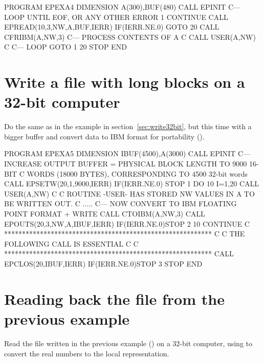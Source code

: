 \begin{XMP}
      PROGRAM EPEXA4
      DIMENSION A(300),BUF(480)
      CALL EPINIT
 C--- LOOP UNTIL EOF, OR ANY OTHER ERROR
     1 CONTINUE
      CALL EPREAD(10,3,NW,A,BUF,IERR)
      IF(IERR.NE.0)  GOTO 20
      CALL CFRIBM(A,NW,3)
 C--- PROCESS CONTENTS OF A
 C
      CALL USER(A,NW)
 C
 C--- LOOP
      GOTO 1
    20 STOP
      END
\end{XMP}

\newpage


\section{Write a file with long blocks on a 32-bit computer}

Do the same as in the example in section~\ref{sec:write32bit},
but this time with a bigger buffer 
and convert data to IBM format for portability ().

\begin{XMP}
      PROGRAM EPEXA5
      DIMENSION IBUF(4500),A(3000)
      CALL EPINIT
 C--- INCREASE OUTPUT BUFFER = PHYSICAL BLOCK LENGTH TO 9000 16-BIT
 C    WORDS (18000 BYTES), CORRESPONDING TO 4500 32-bit words
      CALL EPSETW(20,1,9000,IERR)
      IF(IERR.NE.0)  STOP 1
      DO 10  I=1,20
      CALL USER(A,NW)
 C
 C   ROUTINE -USER- HAS STORED NW VALUES IN A TO BE WRITTEN OUT.
 C   .....
 C--- NOW CONVERT TO IBM FLOATING POINT FORMAT + WRITE
      CALL CTOIBM(A,NW,3)
      CALL EPOUTS(20,3,NW,A,IBUF,IERR)
      IF(IERR.NE.0)STOP 2
   10 CONTINUE
 C **********************************************************
 C
 C                THE FOLLOWING CALL IS ESSENTIAL
 C
 C **********************************************************
      CALL EPCLOS(20,IBUF,IERR)
      IF(IERR.NE.0)STOP 3
      STOP
      END
\end{XMP}

\newpage


\section{Reading back the file from the previous example}

Read the file written in the previous example ()
on a 32-bit computer, using  to convert the real numbers
to the local representation.

